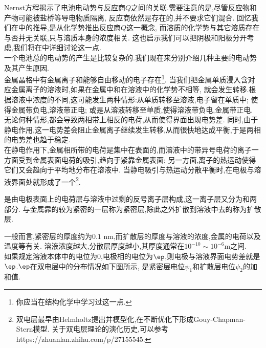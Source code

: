 \documentclass{ctexart}
\begin{document}
Nernst方程揭示了电池电动势与反应商$Q$之间的关联.需要注意的是,尽管反应物和产物可能被盐桥等导电物质隔离,%
反应商依然是存在的,并不要求它们混合.%
回忆我们在中的推导,是从化学势推出反应商$Q$这一概念,%
而溶质的化学势与其它溶质存在与否并无关联,只与溶质本身的浓度相关.%
这也启示我们可以把阴极和阳极分开考虑,我们将在中详细讨论这一点.\vspace{12pt}\\
\indent 一个电池总的电动势的产生是比较复杂的.我们现在来分别介绍几种主要的电动势及其产生原因.\vspace{4pt}\\
\indent 金属晶格中有金属离子和能够自由移动的电子存在\footnote{你应当在结构化学中学习过这一点.}.%
当我们把金属单质浸入含对应金属离子的溶液时,如果在金属中和在溶液中的化学势不相等,%
就会发生转移.根据溶液中浓度的不同,这可能发生两种情形:从单质转移至溶液,电子留在单质中;%
使得金属带负电,溶液带正电;%
或是从溶液转移至单质,使得溶液带负电,金属带正电.\\
\indent 无论何种情形,都会导致两相带上相反的电荷,从而使得界面出现电势差.%
同时,由于静电作用,这一电势差会阻止金属离子继续发生转移,从而很快地达成平衡,于是两相的电势差也趋于稳定.\\
\indent 在静电作用下,金属相所带的电荷是集中在表面的,而溶液中的带异号电荷的离子一方面受到金属表面电荷的吸引,趋向于紧靠金属表面;%
另一方面,离子的热运动使得它们又会趋向于平均地分布在溶液中.%
当静电吸引与热运动分散平衡时,在电极与溶液界面处就形成了一个\footnote{双电层最早由Helmholtz提出并模型化,在不断优化下形成Gouy-Chapman-Stern模型.%
关于双电层理论的演化历史,可以参考https://zhuanlan.zhihu.com/p/27155545.}.
\begin{definition}[6B.3.1 双电层]
    是由电极表面上的电荷层与溶液中过剩的反号离子层构成,这一离子层又分为和两部分.%
    与金属靠的较为紧密的一层称为紧密层,除此之外扩散到溶液中去的称为扩散层.
\end{definition}
一般而言,紧密层的厚度约为$0.1\text{ nm}$,而扩散层的厚度与溶液的浓度,金属的电荷以及温度等有关.%
溶液浓度越大,分散层厚度越小,其厚度通常在$10^{-10}\sim10^{-6}\text{m}$之间.\\
\indent 如果规定溶液本体中的电位为$0$,电极相的电位为$\ep$,则电极与溶液界面电势差就是$\ep$.$\ep$在双电层中的分布情况如下图所示,%
是紧密层电位$\psi_1$和扩散层电位$\psi_2$的加和值.
\begin{tightcenter}
    
\end{tightcenter}
\end{document}
